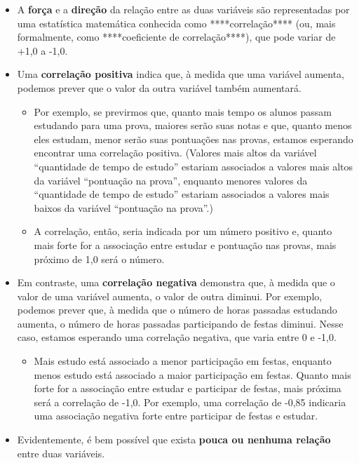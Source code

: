 \documentclass[
]{book}
\providecommand{\tightlist}{%
  \setlength{\itemsep}{0pt}\setlength{\parskip}{0pt}}
\begin{document}
\begin{itemize}
\tightlist
\item
  A \textbf{força} e a \textbf{direção} da relação entre as duas variáveis são representadas por uma estatística matemática conhecida como ****correlação**** (ou, mais formalmente, como ****coeficiente de correlação****), que pode variar de +1,0 a -1,0.
\item
  Uma \textbf{correlação positiva} indica que, à medida que uma variável aumenta, podemos prever que o valor da outra variável também aumentará.

  \begin{itemize}
  \tightlist
  \item
    Por exemplo, se previrmos que, quanto mais tempo os alunos passam estudando para uma prova, maiores serão suas notas e que, quanto menos eles estudam, menor serão suas pontuações nas provas, estamos esperando encontrar uma correlação positiva. (Valores mais altos da variável ``quantidade de tempo de estudo'' estariam associados a valores mais altos da variável ``pontuação na prova'', enquanto menores valores da ``quantidade de tempo de estudo'' estariam associados a valores mais baixos da variável ``pontuação na prova''.)
  \item
    A correlação, então, seria indicada por um número positivo e, quanto mais forte for a associação entre estudar e pontuação nas provas, mais próximo de 1,0 será o número.
  \end{itemize}
\item
  Em contraste, uma \textbf{correlação negativa} demonstra que, à medida que o valor de uma variável aumenta, o valor de outra diminui. Por exemplo, podemos prever que, à medida que o número de horas passadas estudando aumenta, o número de horas passadas participando de festas diminui. Nesse caso, estamos esperando uma correlação negativa, que varia entre 0 e -1,0.

  \begin{itemize}
  \tightlist
  \item
    Mais estudo está associado a menor participação em festas, enquanto menos estudo está associado a maior participação em festas. Quanto mais forte for a associação entre estudar e participar de festas, mais próxima será a correlação de -1,0. Por exemplo, uma correlação de -0,85 indicaria uma associação negativa forte entre participar de festas e estudar.
  \end{itemize}
\item
  Evidentemente, é bem possível que exista \textbf{pouca ou nenhuma relação} entre duas variáveis.


\end{itemize}
\end{document}
